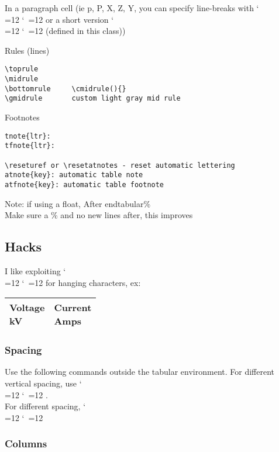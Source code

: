 \documentclass{corpboreport}
\def\cmd{\bgroup\catcode`\\=12 \catcode`\ =12 \cmdA}
\def\cmdA#1{\egroup{\texttt{\detokenize{#1}}}}
\begin{document}
In a paragraph cell (ie p, P, X, Z, Y, you can specify line-breaks with \cmd{\newline} or a short version \cmd{\nl} (defined in this class))

Rules (lines)
\begin{lstlisting}
\toprule
\midrule
\bottomrule		\cmidrule(){}
\gmidrule		custom light gray mid rule
\end{lstlisting}

Footnotes
\begin{lstlisting}
tnote{ltr}:
tfnote{ltr}:

\reseturef or \resetatnotes - reset automatic lettering
atnote{key}: automatic table note
atfnote{key}: automatic table footnote
\end{lstlisting}


Note: if using a float,
After end{tabular}\%\\
Make sure a \% and no new lines after, this improves

\subsection{Hacks}


I like exploiting \cmd{\rlap} for hanging characters, ex:

\begin{LTXexample}
\begin{tabular}{ll}\toprule
\MC{Voltage\rlap{,}\\kV} & \MC{Current\rlap{,}\\Amps} \\\bottomrule
\end{tabular}
\end{LTXexample}



\subsubsection{Spacing}
Use the following commands outside the tabular environment.
For different vertical spacing, use \cmd{\renewcommand{\arraystretch}{1.2}}.\\
For different spacing, \cmd{\setlength\tabcolsep{2ex}}

\subsubsection{Columns}
\end{document}
